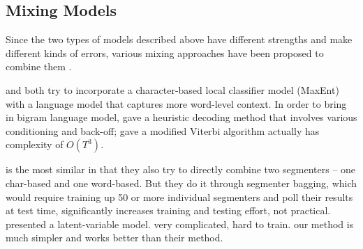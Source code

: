\subsection{Mixing Models} Since the two types of models described above have different strengths and make different kinds of errors, various mixing approaches have been proposed to combine them \cite{Wang:2006:SIGHAN,Lin:2009:CICLing,Sun:2009:HLT-NAACL,Sun:2010:COLING,Wang:2010:COLING}. 


\cite{Lin:2009:CICLing} and \cite{Wang:2006:SIGHAN} both try to incorporate a character-based local classifier model (MaxEnt) with a language model that captures more word-level context.
In order to bring in bigram language model,   gave a heuristic decoding method that involves various conditioning and back-off;  gave a modified Viterbi algorithm actually has complexity of $O(T^3)$. 

\cite{Sun:2009:HLT-NAACL} is the most similar in that they also try to directly combine two segmenters -- one char-based and one word-based. But they do it through segmenter bagging, which would require training up 50 or more individual segmenters and poll their results at test time, significantly increases training and testing effort, not practical.
\cite{Sun:2009:HLT-NAACL} presented a latent-variable model. very complicated, hard to train. our method is much simpler and works better than their method.
